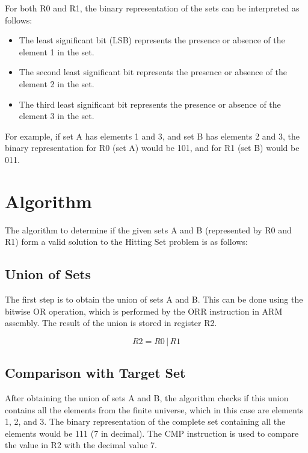For both R0 and R1, the binary representation of the sets can be interpreted as follows:

\begin{itemize}
    \item The least significant bit (LSB) represents the presence or absence of the element 1 in the set.
    \item The second least significant bit represents the presence or absence of the element 2 in the set.
    \item The third least significant bit represents the presence or absence of the element 3 in the set.
\end{itemize}

For example, if set A has elements 1 and 3, and set B has elements 2 and 3, the binary representation for R0 (set A) would be 101, and for R1 (set B) would be 011.

\section{Algorithm}

The algorithm to determine if the given sets A and B (represented by R0 and R1) form a valid solution to the Hitting Set problem is as follows:

\subsection{Union of Sets}

The first step is to obtain the union of sets A and B. This can be done using the bitwise OR operation, which is performed by the ORR instruction in ARM assembly. The result of the union is stored in register R2.

\begin{equation}
    R2 = R0 \, | \, R1
\end{equation}

\subsection{Comparison with Target Set}

After obtaining the union of sets A and B, the algorithm checks if this union contains all the elements from the finite universe, which in this case are elements 1, 2, and 3. The binary representation of the complete set containing all the elements would be 111 (7 in decimal). The CMP instruction is used to compare the value in R2 with the decimal value 7.


